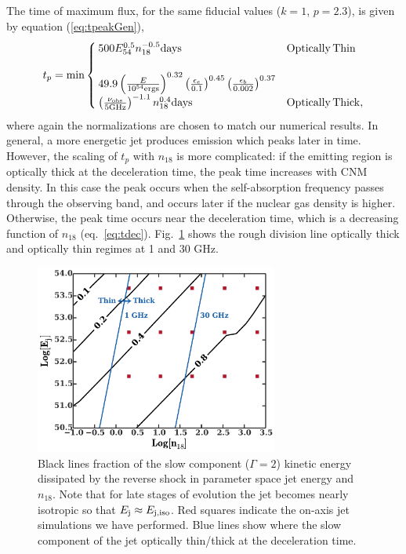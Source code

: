 \documentclass[usenatbib,fleqn]{mnras}
\begin{document}
The time of maximum flux, for the same fiducial values ($k = 1$,
$p=2.3$), is given by equation (\ref{eq:tpeakGen}),
\begin{align}
t_p= \text{min}
\begin{cases}
  500 E_{54}^{0.5} n_{18}^{-0.5} {\rm days} & {\rm Optically\, Thin}\\\\
  49.9 \left(\frac{E}{10^{54} {\rm ergs}}\right)^{0.32}
  \left(\frac{\epsilon_e}{0.1}\right)^{0.45}
  \left(\frac{\epsilon_b}{0.002}\right)^{0.37}\\
  \left(\frac{\nu_{\rm obs}}{5 {\rm GHz}}\right)^{-1.1} n_{18}^{0.4}
  {\rm days}& {\rm Optically\, Thick},
\end{cases}
\label{eq:peakTime}
\end{align}
where again the normalizations are chosen to match our numerical
results. In general, a more energetic jet produces emission which
peaks later in time.  However, the scaling of $t_p$ with $n_{18}$ is
more complicated: if the emitting region is optically thick at the
deceleration time, the peak time increases with CNM density. In this
case the peak occurs when the self-absorption frequency passes through
the observing band, and occurs later if the nuclear gas density is
higher. Otherwise, the peak time occurs near the deceleration time,
which is a decreasing function of $n_{18}$ (eq.~\ref{eq:tdec}).
Fig.~\ref{fig:diss} shows the rough division line optically thick and
optically thin regimes at 1 and 30 GHz.

\begin{figure}
\includegraphics[width=8cm]{diss.pdf}
\caption{\label{fig:diss} Black lines fraction of the slow component
  ($\Gamma=2$) kinetic energy dissipated by the reverse shock in
  parameter space jet energy and $n_{18}$. Note that for late stages
  of evolution the jet becomes nearly isotropic so that $E_{\rm
    j}\approx E_{\rm j, iso}$. Red squares indicate the on-axis jet
  simulations we have performed. Blue lines show where the slow
  component of the jet optically thin/thick at the deceleration time.}
\end{figure}
\end{document}
